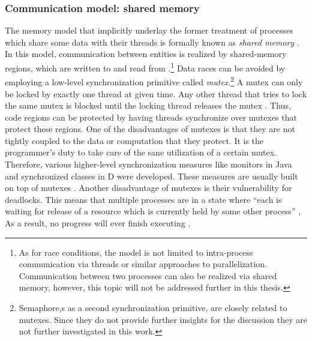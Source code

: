 \subsubsection{Communication model: shared memory}
The memory model that implicitly underlay the former treatment of processes which share some data with their threads is formally known as \textit{shared memory} . In this model, communication between entities is realized by shared-memory regions, which are written to and read from \cite[p.~138]{OperatingSystems_by_Haldar}.\footnote{As for race conditions, the model is not limited to intra-process communication via threads or similar approaches to parallelization. Communication between two processes can also be realized via shared memory, however, this topic will not be addressed further in this thesis.} Data races can be avoided by employing a low-level synchronization primitive called \textit{mutex}.\footnote{Semaphore,s as a second synchronization primitive, are closely related to mutexes. Since they do not provide further insights for the discussion they are not further investigated in this work.} A mutex can only be locked by exactly one thread at given time. Any other thread that tries to lock the same mutex is blocked until the locking thread releases the mutex \cite{AdvancedLinuxProgramming}. Thus, code regions can be protected by having threads synchronize over mutexes that protect these regions. One of the disadvantages of mutexes is that they are not tightly coupled to the data or computation that they protect. It is the programmer's duty to take care of the sane utilization of a certain mutex. Therefore, various higher-level synchronization measures like monitors in Java \cite[p.~42]{ConcurrentAndDistributedComputingInJava} and synchronized classes in D \cite{TheDProgrammingLanguage} were developed. These measures are usually built on top of mutexes \cite[p.~25]{TamingJavaThreads}. Another disadvantage of mutexes is their vulnerability for deadlocks. This means that multiple processes are in a state where ``each is waiting for release of a resource which is currently held by some other process'' \cite[p.~119]{IntroductionToOperatingSystems}, As a result, no progress will ever finish executing \cite[p.~2-3]{OperatingSystems_by_Dhotre}.

